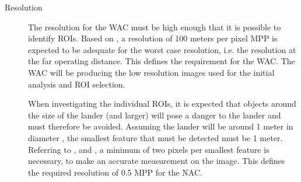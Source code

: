 \begin{description}
\item[Resolution]
The resolution for the WAC must be high enough that it is possible to identify ROIs. Based on , a resolution of 100 meters per pixel MPP is expected to be adequate for the worst case resolution, i.e. the resolution at the far operating distance. This defines the requirement for the WAC. The WAC will be producing the low resolution images used for the initial analysis and ROI selection.

When investigating the individual ROIs, it is expected that objects around the size of the lander (and larger) will pose a danger to the lander and must therefore be avoided. Assuming the lander will be around 1 meter in diameter , the smallest feature that must be detected must be 1 meter. Referring to \cite{andor2016}, \cite{ni2014} and \cite{sbig2014}, a minimum of two pixels per smallest feature is necessary, to make an accurate measurement on the image. This defines the required resolution of 0.5 MPP for the NAC.


\end{description}
